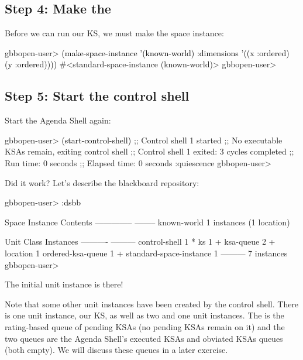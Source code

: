 \documentclass[10pt,twoside,english,pdftex]{article}
\begin{document}
\subsection*{Step 4: Make the }

Before we can run our KS, we must make the  space
instance:
%
\W\supp
\begin{example}
\textcolor{darkergray}{%
  gbbopen-user> \textcolor{black}{(make-space-instance '(known-world)
                          :dimensions '((x :ordered) (y :ordered))))}
  #<standard-space-instance (known-world)>
  gbbopen-user>}
\end{example}

\subsection*{Step 5: Start the control shell}

%
%
Start the Agenda Shell again:
%
\W\supp
\begin{example}
\textcolor{darkergray}{%
  gbbopen-user> \textcolor{black}{(start-control-shell)}
  ;; Control shell 1 started
  ;; No executable KSAs remain, exiting control shell
  ;; Control shell 1 exited: 3 cycles completed
  ;; Run time: 0 seconds
  ;; Elapsed time: 0 seconds
  :quiescence
  gbbopen-user>}
\end{example}

%
%
Did it work?  Let's describe the blackboard repository:
%
\W\supp
\begin{example}
\textcolor{darkergray}{%
  gbbopen-user> \textcolor{black}{:dsbb}
  
  Space Instance                Contents
  --------------                --------
  known-world                   1 instances (1 location)

  Unit Class                    Instances
  ----------                    ---------
  control-shell                         1 *
  ks                                    1 +
  ksa-queue                             2 +
  location                              1
  ordered-ksa-queue                     1 +
  standard-space-instance               1
                                ---------
                                        7 instances
  gbbopen-user>}
\end{example}
%
The initial  unit instance is there!

Note that some other unit instances have been created by the control shell.
There is one  unit instance, our  KS, as well
as two  and one  unit
instances.  The  is the rating-based queue of
pending KSAs (no pending KSAs remain on it) and the two
 queues are the Agenda Shell's executed KSAs and
obviated KSAs queues (both empty).  We will discuss these queues in a later
exercise.
\end{document}
